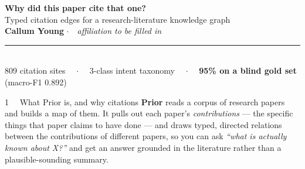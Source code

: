 \documentclass[final]{beamer}
\newcommand{\body}{\fontsize{21}{27}\selectfont}
\newlength{\colw}
\begin{document}
\body
\begin{frame}[t]{}
\vspace{-1.5cm}

\begin{center}
\begin{tcolorbox}[enhanced, colback=pDeep, colframe=pDeep, arc=10pt,
                  left=40pt,right=40pt,top=26pt,bottom=26pt, width=\textwidth]
\centering
{\fontsize{86}{96}\selectfont\bfseries\color{white} Why did this paper cite that one?}\\[14pt]
{\fontsize{46}{54}\selectfont\color{pSand} Typed citation edges for a research-literature knowledge graph}\\[22pt]
{\fontsize{30}{36}\selectfont\color{white}\bfseries Callum Young}\quad
{\fontsize{30}{36}\selectfont\color{pRule} $\cdot$\ \ \textit{affiliation to be filled in}}\\[16pt]
\textcolor{pSand}{\rule{0.5\textwidth}{2pt}}\\[14pt]
{\fontsize{30}{38}\selectfont\color{white}
 809 citation sites \ \ $\cdot$ \ \ 3-class intent taxonomy \ \ $\cdot$ \ \
 \textbf{95\% on a blind gold set} (macro-F1 0.892)}
\end{tcolorbox}
\end{center}

\vspace{22pt}

\noindent
\begin{minipage}[t]{\colw}\vspace{0pt}

\begin{pblock}{1 \ \ What Prior is, and why citations}
\textbf{Prior} reads a corpus of research papers and builds a map of them. It pulls out
each paper's \emph{contributions} --- the specific things that paper claims to have done
--- and draws typed, directed relations between the contributions of different papers, so
you can ask \emph{``what is actually known about X?''} and get an answer grounded in the
literature rather than a plausible-sounding summary.


\end{pblock}
\end{minipage}
\end{frame}
\end{document}
